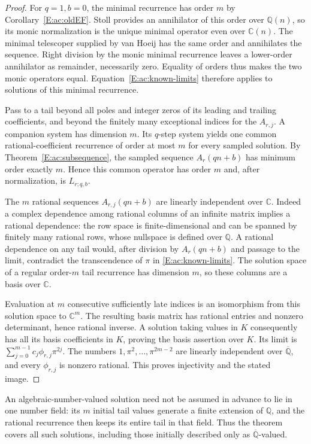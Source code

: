 \documentclass[11pt,a4paper]{article}
\theoremstyle{definition}
\theoremstyle{remark}
\numberwithin{equation}{section}
\begin{document}
\begin{proof}
For $q=1,b=0$, the minimal recurrence has order $m$ by
Corollary~\ref{E:ac:oldEF}. Stoll provides an annihilator of this order
over $\mathbb Q(n)$, so its monic normalization is the unique minimal
operator even over $\mathbb C(n)$. The minimal telescoper supplied
by van Hoeij has the same order and annihilates the sequence. Right
division by the monic minimal recurrence leaves a lower-order
annihilator as remainder, necessarily zero. Equality of orders thus
makes the two monic operators equal. Equation~\eqref{E:ac:known-limits}
therefore applies to solutions of this minimal recurrence.

Pass to a tail beyond all poles and integer zeros of its leading
and trailing coefficients, and beyond the finitely many exceptional
indices for the $A_{r,j}$. A companion system has dimension $m$.
Its $q$-step system yields one common rational-coefficient recurrence
of order at most $m$ for every sampled solution. By
Theorem~\ref{E:ac:subsequence}, the sampled sequence $A_r(qn+b)$
has minimum order exactly $m$. Hence this common operator has order
$m$ and, after normalization, is $L_{r;q,b}$.

The $m$ rational sequences $A_{r,j}(qn+b)$ are linearly independent
over $\mathbb C$. Indeed a complex dependence among rational
columns of an infinite matrix implies a rational dependence: the
row space is finite-dimensional and can be spanned by finitely many
rational rows, whose nullspace is defined over $\mathbb Q$.
A rational dependence on any tail would, after division by
$A_r(qn+b)$ and passage to the limit, contradict the transcendence
of $\pi$ in \eqref{E:ac:known-limits}. The solution space of a regular
order-$m$ tail recurrence has dimension $m$, so these columns are a
basis over $\mathbb C$.

Evaluation at $m$ consecutive sufficiently late indices is an
isomorphism from this solution space to $\mathbb C^m$. The resulting
basis matrix has rational entries and nonzero determinant, hence
rational inverse. A solution taking values in $K$ consequently has
all its basis coefficients in $K$, proving the basis assertion over
$K$. Its limit is
$\sum_{j=0}^{m-1}c_j\phi_{r,j}\pi^{2j}$.
The numbers $1,\pi^2,\ldots,\pi^{2m-2}$ are linearly independent
over $\overline{\mathbb Q}$, and every $\phi_{r,j}$ is nonzero
rational. This proves injectivity and the stated image.
\end{proof}

An algebraic-number-valued solution need not be assumed in advance
to lie in one number field: its $m$ initial tail values generate a
finite extension of $\mathbb Q$, and the rational recurrence then
keeps its entire tail in that field. Thus the theorem covers all such
solutions, including those initially described only as
$\overline{\mathbb Q}$-valued.
\end{document}
